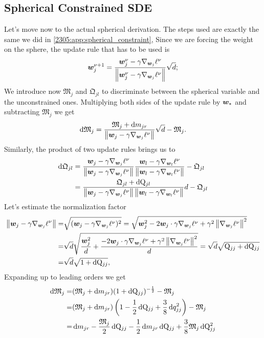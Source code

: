 \subsection{Spherical Constrained SDE}
Let's move now to the actual spherical derivation. The steps used are exactly the same we did in \ref{2305:app:spherical_constraint},  Since we are forcing the weight on the sphere, the update rule that has to be used is
\[
  {\boldsymbol{w}}_j^{\nu+1} =\frac{{\boldsymbol{w}}^\nu_j - \gamma \nabla_{{\boldsymbol{w}}_j}{\ell^\nu}}{\left\|{\boldsymbol{w}}^\nu_j - \gamma \nabla_{{\boldsymbol{w}}_j}{\ell^\nu}\right\|}\sqrt{d};
\]
We introduce now \(\mathfrak{M}_{j}\) and \(\mathfrak{Q}_{jl}\) to discriminate between the spherical variable and the unconstrained ones. Multiplying both sides of the update rule by \({\boldsymbol{w}}_\star\) and subtracting \(\mathfrak{M}_{j}\) we get
\[
  \dif \mathfrak{M}_{j} = \frac{\mathfrak{M}_{j} +\dif m_{jr}}{\left\|\w_j - \gamma \nabla_{\w_j}{\loss}\right\|}\sqrt{d} - \mathfrak{M}_{j}.
\]
Similarly, the product of two update rules brings us to
\[\begin{split}
    \dif\mathfrak{Q}_{jl} &= \frac{\w_j - \gamma \nabla_{\w_j}{\loss}}{\left\|\w_j - \gamma \nabla_{\w_j}{\loss}\right\|} \frac{\w_l - \gamma \nabla_{\w_l}{\loss}}{\left\|\w_l - \gamma \nabla_{\w_l}{\loss}\right\|} - \mathfrak{Q}_{jl} \\
        &= \frac{\mathfrak{Q}_{jl}+\dif \Q_{jl}}{\left\|\w_j - \gamma \nabla_{\w_j}{\loss}\right\|\left\|\w_l - \gamma \nabla_{\w_l}{\loss}\right\|}d- \mathfrak{Q}_{jl}
\end{split}\]
Let's estimate the normalization factor
\[
  \begin{split}
  \left\|\w_{j} - \gamma \nabla_{\w_j}{\loss}\right\| =& \sqrt{(\w_{j} - \gamma \nabla_{\w_j}{\loss})^2}
                                            =  \sqrt{\w_{j}^2 - 2\w_{j}\cdot\gamma \nabla_{\w_j}{\loss}+\gamma^2\left\|\nabla_{\w_j}{\loss}\right\|^2} \\
                                            =& \sqrt{d}\sqrt{\frac{\w_{j}^2}{d} + \frac{- 2\w_{j}\cdot\gamma \nabla_{\w_j}{\loss}+\gamma^2\left\|\nabla_{\w_j}{\loss}\right\|^2}{d}}
                                            = \sqrt{d}\sqrt{\Q_{jj} +\dif \Q_{jj}} \\
                                            =& \sqrt{d}\sqrt{1 +\dif \Q_{jj}},
  \end{split}
\]
Expanding up to leading orders we get
\[\begin{split}
  \dif \mathfrak{M}_{j} =& (\mathfrak{M}_{j} +\dif m_{jr})(1 +\dif \Q_{jj})^{-\frac12} - \mathfrak{M}_{j} \\
            =& (\mathfrak{M}_{j} +\dif m_{jr})\left(1 -\frac12\dif \Q_{jj} + \frac38\dif q^2_{jj}\right)-\mathfrak{M}_{j} \\
            =& \dif m_{jr} - \frac{\mathfrak{M}_{j}}{2}\dif \Q_{jj} -\frac12 \dif m_{jr} \dif \Q_{jj} + \frac38 \mathfrak{M}_{j} \dif \Q_{jj}^2
\end{split}\]
